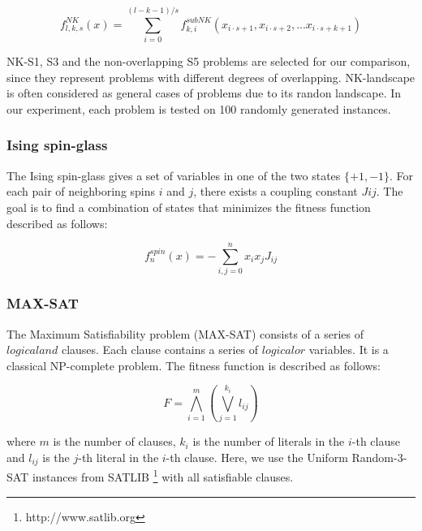 \documentclass{sig-alternate-05-2015}
\begin{document}
\begin{displaymath}
f_{l,k,s}^{NK}(x) = \sum_{i=0}^{(l-k-1)/s} f_{k,i}^{subNK} (x_{i{\cdot}s+1},x_{i{\cdot}s+2},...x_{i{\cdot}s+k+1})
\end{displaymath}


NK-S1, S3 and the non-overlapping S5 problems are selected for our comparison, since they represent problems with different degrees of overlapping. 
NK-landscape is often considered as general cases of problems due to its randon landscape.
In our experiment, each problem is tested on 100 randomly generated instances.



\subsubsection{Ising spin-glass}
The Ising spin-glass gives a set of variables in one of the two states $\{+1, -1\}$. For each pair of neighboring spins $i$ and $j$, there exists a coupling constant $Jij$. The goal is to find a combination of states that minimizes the fitness function described as follows:

\begin{displaymath}
f_{n}^{spin}(x) = -\sum_{i,j=0}^{n} x_{i}x_{j}J_{ij}
\end{displaymath}


\subsubsection{MAX-SAT}
The Maximum Satisfiability problem (MAX-SAT) consists of a series of $logical and$ clauses. Each clause contains a series of $logical or$ variables. It is a classical NP-complete problem. The fitness function is described as follows:  

\begin{displaymath}
F = \bigwedge_{i=1}^{m} \left (\bigvee_{j=1}^{k_{i}} l_{ij} \right )
\end{displaymath}

where $m$ is the number of clauses, $k_i$ is the number of literals in the $i$-th clause and $l_{ij}$ is the $j$-th literal in the $i$-th clause. Here, we use the Uniform Random-3-SAT instances from SATLIB \footnote{http://www.satlib.org} with all satisfiable clauses.  
\end{document}
